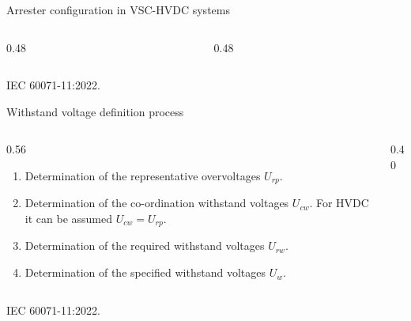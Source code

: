 \begin{frame}{Arrester configuration in VSC-HVDC systems}
  \begin{columns}[c,onlytextwidth]
    \begin{column}{0.48\textwidth}
      \centering
    \end{column}
    \begin{column}{0.48\textwidth}
      \centering
    \end{column}
  \end{columns}
  \vspace{0.3em}
  {\color{atGray}\footnotesize IEC 60071-11:2022.}
\end{frame}

\begin{frame}{Withstand voltage definition process}
  \begin{columns}[c,onlytextwidth]
    \begin{column}{0.56\textwidth}
      \begin{enumerate}
        \setlength{\itemsep}{0.4em}
        \item Determination of the representative overvoltages $U_{rp}$.
        \item Determination of the co-ordination withstand voltages
              $U_{cw}$. For HVDC it can be assumed $U_{cw} = U_{rp}$.
        \item Determination of the required withstand voltages $U_{rw}$.
        \item Determination of the specified withstand voltages $U_w$.
      \end{enumerate}
    \end{column}
    \begin{column}{0.40\textwidth}
      \centering
    \end{column}
  \end{columns}
  \vspace{0.2em}
  {\color{atGray}\footnotesize IEC 60071-11:2022.}
\end{frame}

